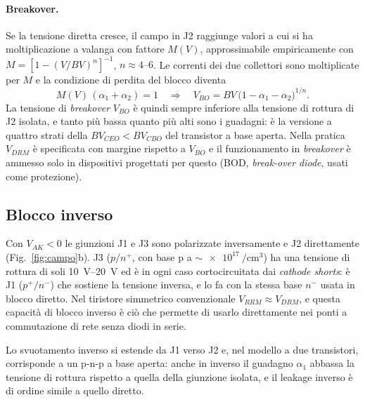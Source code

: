 \documentclass[11pt,a4paper]{article}
\newcommand{\VAK}{\ensuremath{V_{AK}}}
\newcommand{\VBO}{\ensuremath{V_{BO}}}
\newcommand{\VDRM}{\ensuremath{V_{DRM}}}
\newcommand{\VRRM}{\ensuremath{V_{RRM}}}
\newcommand{\en}[1]{\emph{#1}}   %
\begin{document}
\paragraph{Breakover.} Se la tensione diretta cresce, il campo in J2 raggiunge valori a cui si ha moltiplicazione a valanga con fattore $M(V)$, approssimabile empiricamente con $M = [1-(V/BV)^n]^{-1}$, $n\approx\numrange{4}{6}$. Le correnti dei due collettori sono moltiplicate per $M$ e la condizione di perdita del blocco diventa
\begin{equation}
  M(V)\,(\alpha_1+\alpha_2) = 1 \quad\Longrightarrow\quad
  \VBO = BV\,\bigl(1-\alpha_1-\alpha_2\bigr)^{1/n}.
  \label{eq:VBO}
\end{equation}
La tensione di \en{breakover} $\VBO$ è quindi sempre inferiore alla tensione di rottura di J2 isolata, e tanto più bassa quanto più alti sono i guadagni: è la versione a quattro strati della $BV_{CEO}<BV_{CBO}$ del transistor a base aperta. Nella pratica $\VDRM$ è specificata con margine rispetto a $\VBO$ e il funzionamento in \en{breakover} è ammesso solo in dispositivi progettati per questo (BOD, \en{break-over diode}, usati come protezione).

\subsection{Blocco inverso}
Con $\VAK<0$ le giunzioni J1 e J3 sono polarizzate inversamente e J2 direttamente (Fig.~\ref{fig:campo}b). J3 ($p/n^+$, con base p a $\sim\qty{e17}{\per\cm\cubed}$) ha una tensione di rottura di soli \qtyrange{10}{20}{\V} ed è in ogni caso cortocircuitata dai \en{cathode shorts}: è J1 ($p^+/n^-$) che sostiene la tensione inversa, e lo fa con la stessa base $n^-$ usata in blocco diretto. Nel tiristore simmetrico convenzionale $\VRRM\approx\VDRM$, e questa capacità di blocco inverso è ciò che permette di usarlo direttamente nei ponti a commutazione di rete senza diodi in serie.

Lo svuotamento inverso si estende da J1 verso J2 e, nel modello a due transistori, corrisponde a un p-n-p a base aperta: anche in inverso il guadagno $\alpha_1$ abbassa la tensione di rottura rispetto a quella della giunzione isolata, e il leakage inverso è di ordine simile a quello diretto.
\end{document}
